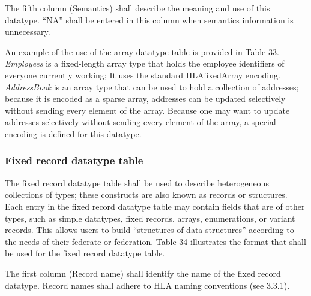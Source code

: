 The fifth column (Semantics) shall describe the meaning and use of this datatype. ``NA'' shall be entered in this column when semantics information is unnecessary.

An example of the use of the array datatype table is provided in Table 33. \textit{Employees} is a fixed-length array type that holds the employee identifiers of everyone currently working; It uses the standard HLAfixedArray encoding. \textit{AddressBook} is an array type that can be used to hold a collection of addresses; because it is encoded as a sparse array, addresses can be updated selectively without sending every element of the array. Because one may want to update addresses selectively without sending every element of the array, a special encoding is defined for this datatype.

\subsubsection{Fixed record datatype table}
The fixed record datatype table shall be used to describe heterogeneous collections of types; these constructs are also known as records or structures. Each entry in the fixed record datatype table may contain fields that are of other types, such as simple datatypes, fixed records, arrays, enumerations, or variant records. This allows users to build ``structures of data structures'' according to the needs of their federate or federation. Table 34 illustrates the format that shall be used for the fixed record datatype table.

The first column (Record name) shall identify the name of the fixed record datatype. Record names shall adhere to HLA naming conventions (see 3.3.1).


